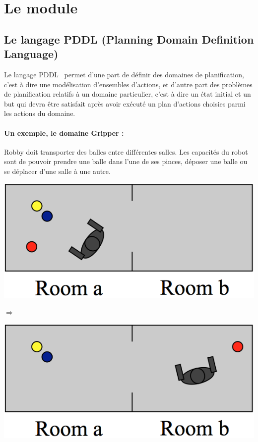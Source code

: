 \section{Le module \touistplan}

\subsection{Le langage PDDL (Planning Domain Definition Language)}

Le langage PDDL~ permet d'une part de définir des domaines de planification, c'est à dire une modélisation d'ensembles d'actions, et d'autre part des problèmes de planification relatifs à un domaine particulier, c'est à dire un état initial et un but qui devra être satisfait après avoir exécuté un plan d'actions choisies parmi les actions du domaine.

\paragraph*{Un exemple, le domaine Gripper :} Robby doit transporter des balles entre différentes salles. Les capacités du robot sont de pouvoir prendre une balle dans l'une de ses pinces, déposer une balle ou se déplacer d'une salle à une autre.%

\begin{center}
  \begin{minipage}[c]{.38\linewidth}
   \includegraphics[scale=0.55]{figures/robby_a_3balls.png}
  \end{minipage}
  \begin{minipage}[c]{.05\linewidth}
    $\Rightarrow$
  \end{minipage}
  \begin{minipage}[c]{.38\linewidth}
    \includegraphics[scale=0.55]{figures/robby_b_3balls.png}
  \end{minipage}
\end{center}

